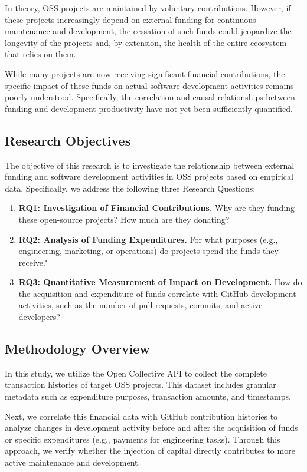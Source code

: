 \documentclass[11pt]{ist-thesis-lt}
\begin{document}
In theory, OSS projects are maintained by voluntary contributions. However, if these projects increasingly depend on external funding for continuous maintenance and development, the cessation of such funds could jeopardize the longevity of the projects and, by extension, the health of the entire ecosystem that relies on them.

While many projects are now receiving significant financial contributions, the specific impact of these funds on actual software development activities remains poorly understood. Specifically, the correlation and causal relationships between funding and development productivity have not yet been sufficiently quantified.

\subsection{Research Objectives}
The objective of this research is to investigate the relationship between external funding and software development activities in OSS projects based on empirical data. Specifically, we address the following three Research Questions:

\begin{enumerate}
    \item \textbf{RQ1: Investigation of Financial Contributions.} Why are they funding these open-source projects? How much are they donating?
    \item \textbf{RQ2: Analysis of Funding Expenditures.} For what purposes (e.g., engineering, marketing, or operations) do projects spend the funds they receive?
    \item \textbf{RQ3: Quantitative Measurement of Impact on Development.} How do the acquisition and expenditure of funds correlate with GitHub development activities, such as the number of pull requests, commits, and active developers?
\end{enumerate}

\subsection{Methodology Overview}
In this study, we utilize the Open Collective API\cite{sample} to collect the complete transaction histories of target OSS projects. This dataset includes granular metadata such as expenditure purposes, transaction amounts, and timestamps.

Next, we correlate this financial data with GitHub contribution histories to analyze changes in development activity before and after the acquisition of funds or specific expenditures (e.g., payments for engineering tasks). Through this approach, we verify whether the injection of capital directly contributes to more active maintenance and development.
\end{document}

